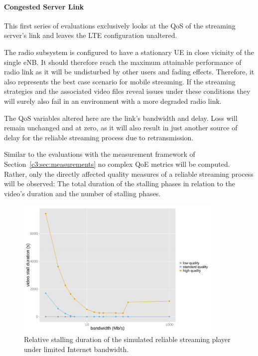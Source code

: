 \paragraph{Congested Server Link}

This first series of evaluations exclusively looks at the \gls{QoS} of the streaming server's link and leaves the \gls{LTE} configuration unaltered.

The radio subsystem is configured to have a stationary \gls{UE} in close vicinity of the single \gls{eNB}. It should therefore reach the maximum attainable performance of radio link as it will be undisturbed by other users and fading effects. Therefore, it also represents the best case scenario for mobile streaming. If the streaming strategies and the associated video files reveal issues under these conditions they will surely also fail in an environment with a more degraded radio link.

The \gls{QoS} variables altered here are the link's bandwidth and delay. Loss will remain unchanged and at zero, as it will also result in just another source of delay for the reliable streaming process due to retransmission. 

Similar to the evaluations with the measurement framework of Section~\ref{c3:sec:measurements} no complex \gls{QoE} metrics will be computed. Rather, only the directly affected quality measures of a reliable streaming process will be observed: The total duration of the stalling phases in relation to the video's duration and the number of stalling phases.

\begin{figure}[htb]
	\centering
	\includegraphics[width=0.9\textwidth]{images/R-ltesim-bwseries-stallduration.pdf}
	\caption{Relative stalling duration of the simulated reliable streaming player under limited Internet bandwidth.}
\label{c6:fig:ltesim-bwseries-stallduration}
\end{figure}


